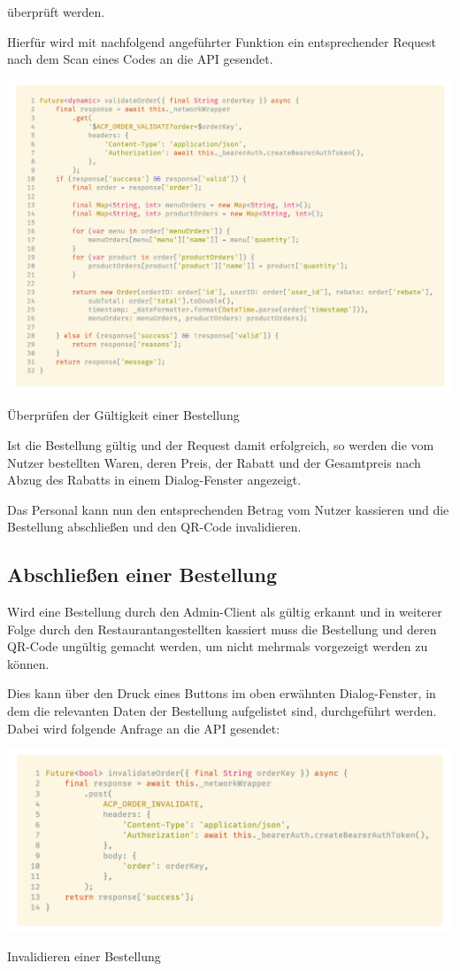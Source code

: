 überprüft werden.

Hierfür wird mit nachfolgend angeführter Funktion ein entsprechender Request nach dem Scan eines Codes
an die API gesendet.

\begin{code}[H]
    \centering
    \includegraphics[width=1\textwidth]{images/Admin-Client/services/acpordervalidation/validateOrder.png}
    \vspace{-25pt}
    \caption{Überprüfen der Gültigkeit einer Bestellung}
\end{code}

Ist die Bestellung gültig und der Request damit erfolgreich, so werden die vom Nutzer bestellten
Waren, deren Preis, der Rabatt und der Gesamtpreis nach Abzug des Rabatts in einem Dialog-Fenster
angezeigt.

Das Personal kann nun den entsprechenden Betrag vom Nutzer kassieren und die Bestellung abschließen
und den QR-Code invalidieren.

\subsection{Abschließen einer Bestellung}

Wird eine Bestellung durch den Admin-Client als gültig erkannt und in weiterer Folge durch den
Restaurantangestellten kassiert muss die Bestellung und deren QR-Code ungültig gemacht werden,
um nicht mehrmals vorgezeigt werden zu können.

Dies kann über den Druck eines Buttons im oben erwähnten Dialog-Fenster, in dem die relevanten Daten
der Bestellung aufgelistet sind, durchgeführt werden.\\
Dabei wird folgende Anfrage an die API gesendet:

\begin{code}[H]
    \centering
    \includegraphics[width=1\textwidth]{images/Admin-Client/services/acpordervalidation/invalidateOrder.png}
    \vspace{-25pt}
    \caption{Invalidieren einer Bestellung}
\end{code}

